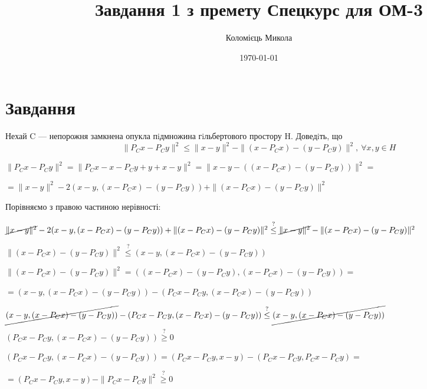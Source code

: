 \documentclass[a4paper, 14pt]{extreport}
\title{Завдання 1 з премету Спецкурс для ОМ-3}
\author{Коломієць Микола}
\date{\today}
\begin{document}
    \maketitle

    \tableofcontents


    \chapter{Завдання \theHchapter}

    \begin{tcolorbox}[title=Завдання]
        Нехай C — непорожня замкнена опукла пiдмножина гiльбертового простору H. Доведiть, що
        $$ \| P_Cx - P_Cy  \|^ 2 \le
        \| x - y \| ^ 2 - 
        \| (x - P_Cx) - (y - P_Cy) \| ^ 2, \ \forall x, y \in H $$
    \end{tcolorbox}



    $ \| P_Cx - P_Cy  \|^ 2 = \| P_Cx - x - P_Cy + y + x - y  \|^ 2 = 
    \| x - y - ((x - P_Cx) - (y - P_Cy))  \|^ 2 = $


    $= \| x - y \| ^ 2 - 2 ( x - y,(x - P_Cx) - (y - P_Cy) ) + 
    \| (x - P_Cx) - (y - P_Cy) \| ^ 2 $


    Порівняємо з правою частиною нерівності:
    
    
    $ \cancel{\| x - y \| ^ 2} - 2 ( x - y,(x - P_Cx) - (y - P_Cy) ) + 
    \| (x - P_Cx) - (y - P_Cy) \| ^ 2 \stackrel{?}{\le} 
    \cancel{\|x - y\|^2} - \| (x - P_Cx) - (y - P_Cy) \| ^ 2 $



    $\|(x - P_Cx) - (y - P_Cy) \| ^ 2 \stackrel{?}{\le} 
    (x - y,(x - P_Cx) - (y - P_Cy))$


    $ \|(x - P_Cx) - (y - P_Cy) \| ^ 2 = 
    ((x - P_Cx) - (y - P_Cy), (x - P_Cx) - (y - P_Cy)) =$
    

    $= (x - y, (x - P_Cx) - (y - P_Cy)) - (P_Cx - P_Cy, (x - P_Cx) - (y - P_Cy)) $


    $ \cancel{(x - y, (x - P_Cx) - (y - P_Cy))} - (P_Cx - P_Cy, (x - P_Cx) - (y - P_Cy)) 
    \stackrel{?}{\le} \cancel{(x - y,(x - P_Cx) - (y - P_Cy))} $


    $(P_Cx - P_Cy, (x - P_Cx) - (y - P_Cy)) \stackrel{?}{\geq} 0 $


    $(P_Cx - P_Cy, (x - P_Cx) - (y - P_Cy)) = 
    (P_Cx - P_Cy, x - y) - (P_Cx - P_Cy,  P_Cx - P_Cy) = $


    $=(P_Cx - P_Cy, x - y) - \|P_Cx - P_Cy \|^2 \stackrel{?}{\geq} 0 $
\end{document}
